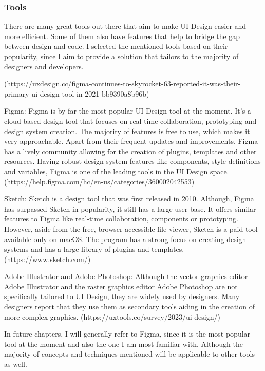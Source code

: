 \subsubsection{Tools}
There are many great tools out there that aim to make UI Design easier and more efficient. Some of
them also have features that help to bridge the gap between design and code. I selected the
mentioned tools based on their popularity, since I aim to provide a solution that tailors to the
majority of designers and developers.

(https://uxdesign.cc/figma-continues-to-skyrocket-63-reported-it-was-their-primary-ui-design-tool-in-2021-bb9390a8b96b)

Figma: Figma is by far the most popular UI Design tool at the moment. It's a cloud-based design tool
that focuses on real-time collaboration, prototyping and design system creation. The majority of
features is free to use, which makes it very approachable. Apart from their frequent updates and
improvements, Figma has a lively community allowing for the creation of plugins, templates and other
resources. Having robust design system features like components, style definitions and variables,
Figma is one of the leading tools in the UI Design space.
(https://help.figma.com/hc/en-us/categories/360002042553)

Sketch: Sketch is a design tool that was first released in 2010. Although, Figma has surpassed
Sketch in popularity, it still has a large user base. It offers similar features to Figma like
real-time collaboration, components or prototyping. However, aside from the free, browser-accessible
file viewer, Sketch is a paid tool available only on macOS. The program has a strong focus on
creating design systems and has a large library of plugins and templates. (https://www.sketch.com/)

Adobe Illustrator and Adobe Photoshop: Although the vector graphics editor Adobe Illustrator and the
raster graphics editor Adobe Photoshop are not specifically tailored to UI Design, they are widely
used by designers. Many designers report that they use them as secondary tools aiding in the
creation of more complex graphics. (https://uxtools.co/survey/2023/ui-design/)

In future chapters, I will generally refer to Figma, since it is the most popular tool at the moment
and also the one I am most familiar with. Although the majority of concepts and techniques mentioned
will be applicable to other tools as well.
